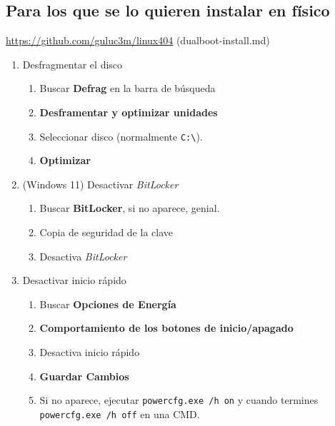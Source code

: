 \documentclass[aspectratio=43]{beamer}
\begin{document}
    \subsection{Para los que se lo quieren instalar en físico}
    \begin{frame}[fragile]{\subsecname}{\secname}
        \url{https://github.com/guluc3m/linux404} (dualboot-install.md)
        \begin{enumerate}
            \pause
            \item Desfragmentar el disco
            \begin{enumerate}
                \item Buscar \textbf{Defrag} en la barra de búsqueda
                \item \textbf{Desframentar y optimizar unidades}
                \item Seleccionar disco (normalmente \verb!C:\!).
                \item \textbf{Optimizar}
            \end{enumerate}
            \pause
            \item (Windows 11) Desactivar \textit{BitLocker}
            \pause
            \begin{enumerate}
                \item Buscar \textbf{BitLocker}, si no aparece, genial.
                \item Copia de seguridad de la clave
                \item Desactiva \textit{BitLocker}
            \end{enumerate}
            \pause
            \item Desactivar inicio rápido
            \begin{enumerate}
                \item Buscar \textbf{Opciones de Energía}
                \item \textbf{Comportamiento de los botones de inicio/apagado}
                \item Desactiva inicio rápido
                \item \textbf{Guardar Cambios}
                \item Si no aparece, ejecutar \verb!powercfg.exe /h on! y
                cuando termines \verb!powercfg.exe /h off! en una CMD.
            \end{enumerate}
        \end{enumerate}
    \end{frame}
\end{document}
